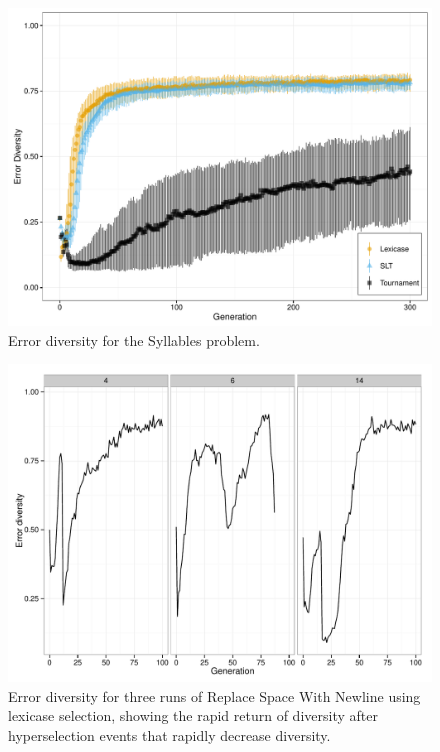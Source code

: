 \documentclass{sig-alternate}
\begin{document}
\begin{figure}[t] %
\centering
\includegraphics[width=\linewidth]{syllables-div.pdf}
\caption{Error diversity for the Syllables problem.}
\label{fig:syllables-div}
\end{figure}

\begin{figure}[h]
	\centering
	\includegraphics[width=\linewidth]{lexicasebounceback.pdf}
	\caption{Error diversity for three runs of Replace Space With Newline using lexicase selection, showing the rapid return of diversity after hyperselection events that rapidly decrease diversity.}
	\label{fig:rswnBounceback}
\end{figure}
\end{document}
